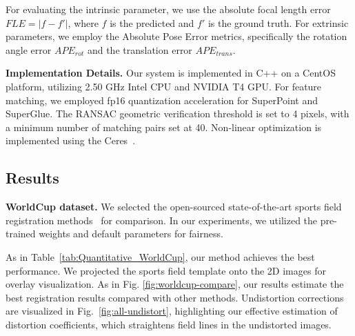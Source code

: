 For evaluating the intrinsic parameter, we use the absolute focal length error $FLE = |f - f'|$, where $f$ is the predicted and $f'$ is the ground truth. For extrinsic parameters, we employ the Absolute Pose Error metrics, specifically the rotation angle error $APE_{rot}$ and the translation error $APE_{trans}$.

\textbf{Implementation Details.} 
Our system is implemented in C++ on a CentOS platform, utilizing 2.50 GHz Intel CPU and NVIDIA T4 GPU. For feature matching, we employed fp16 quantization acceleration for SuperPoint and SuperGlue. The RANSAC geometric verification threshold is set to 4 pixels, with a minimum number of matching pairs set at 40. Non-linear optimization is implemented using the Ceres~\cite{Ceres}.

\subsection{Results}

\textbf{WorldCup dataset.}
We selected the open-sourced state-of-the-art sports field registration methods~\cite{Chen2019SportsCC,jiang2020optimizing,Nie2021ARA,Chu_2022_CVPR,Theiner:2023:TVCalib} for comparison. In our experiments, we utilized the pre-trained weights and default parameters for fairness.

As in Table~\ref{tab:Quantitative_WorldCup}, our method achieves the best performance. We projected the sports field template onto the 2D images for overlay visualization. As in Fig. \ref{fig:worldcup-compare}, our results estimate the best registration results compared with other methods. Undistortion corrections are visualized in Fig.~\ref{fig:all-undistort}, highlighting our effective estimation of distortion coefficients, which straightens field lines in the undistorted images.

\begin{table}[t!]
\caption{Comparisons of IoU on the WorldCup dataset.}
\label{tab:Quantitative_WorldCup}
    \centering
\end{table}


